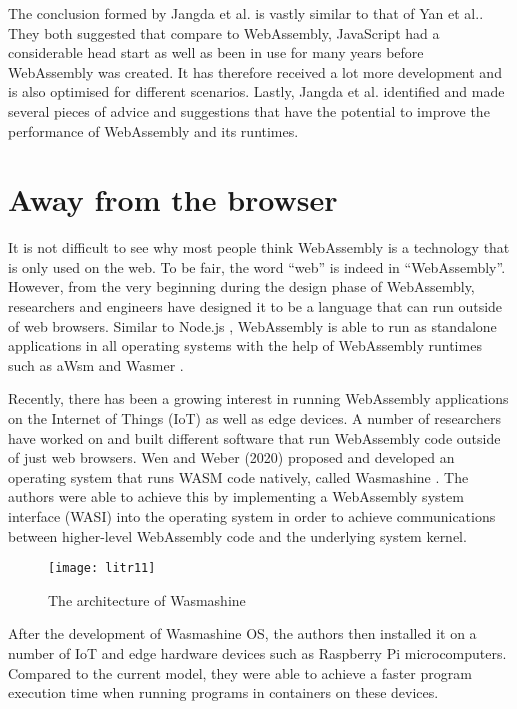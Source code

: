 The conclusion formed by Jangda et al. is vastly similar to that of Yan et al.. They both suggested that compare to WebAssembly, JavaScript had a considerable head start as well as been in use for many years before WebAssembly was created. It has therefore received a lot more development and is also optimised for different scenarios. Lastly, Jangda et al. identified and made several pieces of advice and suggestions that have the potential to improve the performance of WebAssembly and its runtimes.

\bigskip
\section{Away from the browser}

It is not difficult to see why most people think WebAssembly is a technology that is only used on the web. To be fair, the word “web” is indeed in “WebAssembly”. However, from the very beginning during the design phase of WebAssembly, researchers and engineers have designed it to be a language that can run outside of web browsers. Similar to Node.js \cite{lit22}, WebAssembly is able to run as standalone applications in all operating systems with the help of WebAssembly runtimes such as aWsm and Wasmer \cite{lit23} \cite{lit24}.

Recently, there has been a growing interest in running WebAssembly applications on the Internet of Things (IoT) as well as edge devices. A number of researchers have worked on and built different software that run WebAssembly code outside of just web browsers. Wen and Weber (2020) proposed and developed an operating system that runs WASM code natively, called Wasmashine \cite{lit25} \cite{lit26}. The authors were able to achieve this by implementing a WebAssembly system interface (WASI) into the operating system in order to achieve communications between higher-level WebAssembly code and the underlying system kernel.

\bigskip
\begin{figure}[hp]
\centering
\texttt{[image: litr11]}
\caption{\footnotesize{The architecture of Wasmashine \cite{lit25}}}
\captionsetup{aboveskip=0pt,font=it}
\end{figure}
\bigskip

After the development of Wasmashine OS, the authors then installed it on a number of IoT and edge hardware devices such as Raspberry Pi microcomputers. Compared to the current model, they were able to achieve a faster program execution time when running programs in containers on these devices.

